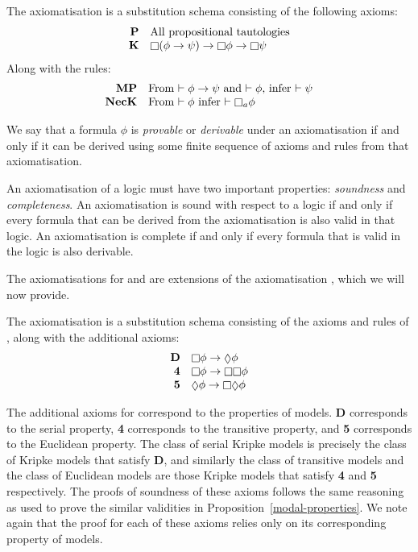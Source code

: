 \begin{definition}
The axiomatisation \axiomK{} is a substitution schema consisting of the
following axioms:
$$
\begin{array}{rl}
{\bf P} & \text{All propositional tautologies}\\
{\bf K} & \knows (\phi \implies \psi) \implies \knows \phi \implies \knows
\psi\\
\end{array}
$$
Along with the rules:
$$
\begin{array}{rl}
{\bf MP} & \text{From $\proves \phi \implies \psi$ and $\proves \phi$, infer
$\proves \psi$}\\
{\bf NecK} & \text{From $\proves \phi$ infer $\proves \knows_a \phi$}\\
\end{array}
$$
\end{definition}

We say that a formula $\phi$ is {\em provable} or {\em derivable} under an
axiomatisation if and only if it can be derived using some finite sequence of
axioms and rules from that axiomatisation.

An axiomatisation of a logic must have two important properties: {\em soundness}
and {\em completeness}. An axiomatisation is sound with respect to a logic if
and only if every formula that can be derived from the axiomatisation is also
valid in that logic. An axiomatisation is complete if and only if every formula
that is valid in the logic is also derivable.

The axiomatisations for \logicKD{} and \logicS{} are extensions of the
axiomatisation \axiomK{}, which we will now provide.

\begin{definition}
The axiomatisation \axiomKD{} is a substitution schema consisting of the axioms
and rules of \axiomK{}, along with the additional axioms:
$$
\begin{array}{rl}
{\bf D} & \knows \phi \implies \suspects \phi\\
{\bf 4} & \knows \phi \implies \knows \knows \phi\\
{\bf 5} & \suspects \phi \implies \knows \suspects \phi\\
\end{array}
$$
\end{definition}

The additional axioms for \axiomKD{} correspond to the properties of \classKD{}
models. {\bf D} corresponds to the serial property, {\bf 4} corresponds to the
transitive property, and {\bf 5} corresponds to the Euclidean property. The
class of serial Kripke models is precisely the class of Kripke models that
satisfy {\bf D}, and similarly the class of transitive models and the class of
Euclidean models are those Kripke models that satisfy {\bf 4} and {\bf 5}
respectively. The proofs of soundness of these axioms follows the same reasoning
as used to prove the similar validities in Proposition~\ref{modal-properties}.
We note again that the proof for each of these axioms relies only on its
corresponding property of \classKD{} models.

